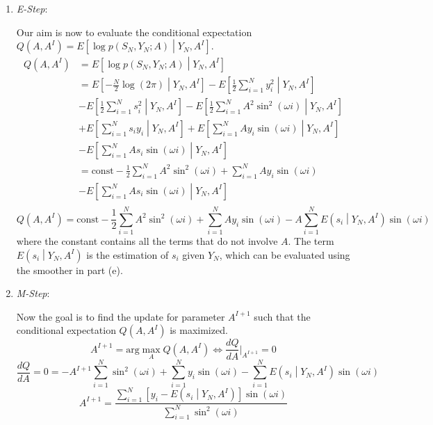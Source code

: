\documentclass[a4paper, 11pt]{article}
\begin{document}
\begin{enumerate}
\item \textit{E-Step}:

Our aim is now to evaluate the conditional expectation $Q(A, A^I) = E\left[\log p(S_N, Y_N; A) \middle| Y_N, A^I \right]$.
\begin{equation}
\begin{split}
Q(A, A^I) & = E\left[\log p(S_N, Y_N; A) \middle| Y_N, A^I \right]\\
 & = E\left[ -\frac{N}{2}\log(2\pi) \middle|Y_N, A^I \right] - E\left[ \frac{1}{2}\sum_{i=1}^Ny_i^2 \middle|Y_N, A^I \right] \\
 & - E\left[ \frac{1}{2}\sum_{i=1}^Ns_i^2 \middle|Y_N, A^I \right] - E\left[ \frac{1}{2}\sum_{i=1}^N A^2\sin^2(\omega i) \middle|Y_N, A^I \right] \\
 & + E\left[ \sum_{i=1}^N s_iy_i \middle|Y_N, A^I \right] + E\left[ \sum_{i=1}^NAy_i\sin(\omega i) \middle|Y_N, A^I \right] \\
 & - E\left[ \sum_{i=1}^N As_i\sin(\omega i) \middle|Y_N, A^I \right] \\
 & = \text{const} - \frac{1}{2}\sum_{i=1}^N A^2\sin^2(\omega i) + \sum_{i=1}^NAy_i\sin(\omega i)\\
 & - E\left[ \sum_{i=1}^N As_i\sin(\omega i) \middle|Y_N, A^I \right]\\ 
\end{split}
\end{equation}
\begin{equation}
Q(A, A^I) = \text{const} - \frac{1}{2}\sum_{i=1}^N A^2\sin^2(\omega i) + \sum_{i=1}^NAy_i\sin(\omega i) - A\sum_{i=1}^N E\left(s_i \middle| Y_N, A^I \right)\sin(\omega i)
\end{equation}
where the constant contains all the terms that do not involve $A$. The term $E\left(s_i \middle| Y_N, A^I \right)$ is the estimation of $s_i$ given $Y_N$, which can be evaluated using the smoother in part (e). 

\item \textit{M-Step}:

Now the goal is to find the update for parameter $A^{I+1}$ such that the conditional expectation $Q(A, A^I)$ is maximized. 
\begin{equation}
A^{I+1} = \text{arg}\max_{A} Q(A, A^I) \iff \frac{dQ}{dA}\Bigg|_{A^{I+1}}=0
\end{equation}
\begin{equation}
\frac{dQ}{dA} = 0 = -A^{I+1}\sum_{i=1}^N\sin^2(\omega i) + \sum_{i=1}^Ny_i\sin(\omega i) - \sum_{i=1}^N E\left(s_i\middle| Y_N, A^I \right)\sin(\omega i)
\end{equation}
\begin{equation}
A^{I+1} = \frac{\sum_{i=1}^N\left[ y_i - E\left(s_i\middle| Y_N, A^I \right)\right]\sin(\omega i) }{\sum_{i=1}^N\sin^2(\omega i)}
\end{equation}
\end{enumerate}
\end{document}
